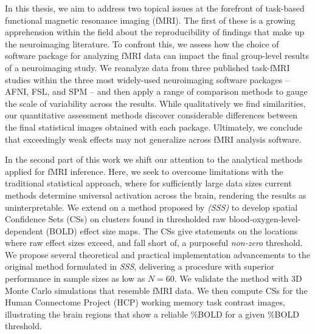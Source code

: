 \documentclass[11pt,a4paper]{report}
\begin{document}

 \thesistitlepage                     %


\begin{singlespace}
\begin{thesisabstract}
\begin{singlespace}
In this thesis, we aim to address two topical issues at the forefront of task-based functional magnetic resonance imaging (fMRI). The first of these is a growing apprehension within the field about the reproducibility of findings that make up the neuroimaging literature. To confront this, we assess how the choice of software package for analyzing fMRI data can impact the final group-level results of a neuroimaging study. We reanalyze data from three published task-fMRI studies within the three most widely-used neuroimaging software packages -- AFNI, FSL, and SPM -- and then apply a range of comparison methods to gauge the scale of variability across the results. While qualitatively we find similarities, our quantitative assessment methods discover considerable differences between the final statistical images obtained with each package. Ultimately, we conclude that exceedingly weak effects may not generalize across fMRI analysis software. 

In the second part of this work we shift our attention to the analytical methods applied for fMRI inference. Here, we seek to overcome limitations with the traditional statistical approach, where for sufficiently large data sizes current methods determine universal activation across the brain, rendering the results as uninterpretable. We extend on a method proposed by \textit{\citet*{Sommerfeld2018-zl}} \textit{(SSS)} to develop spatial Confidence Sets (CSs) on clusters found in thresholded raw blood-oxygen-level-dependent (BOLD) effect size maps. The CSs give statements on the locations where raw effect sizes exceed, and fall short of, a purposeful \textit{non-zero} threshold. We propose several theoretical and practical implementation advancements to the original method formulated in \textit{SSS}, delivering a procedure with superior performance in sample sizes as low as $N = 60$. We validate the method with 3D Monte Carlo simulations that resemble fMRI data. We then compute CSs for the Human Connectome Project (HCP) working memory task contrast images, illustrating the brain regions that show a reliable \%BOLD for a given \%BOLD threshold. 


\end{singlespace}
\end{thesisabstract}
\end{singlespace}
\end{document}

